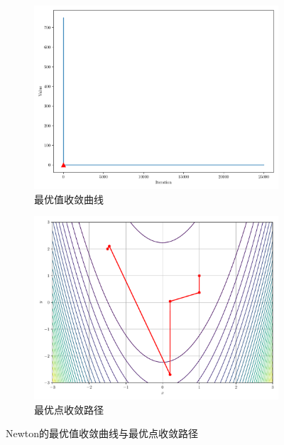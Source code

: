 \begin{figure}[!ht]
    \centering
    \begin{subfigure}{0.4\textwidth}
        \centering
        \includegraphics[width=\textwidth]{figures/Newton_loss.pdf}
        \caption{最优值收敛曲线}
    \end{subfigure}
    \begin{subfigure}{0.4\textwidth}
        \centering
        \includegraphics[width=\textwidth]{figures/Newton_points.pdf}
        \caption{最优点收敛路径}
    \end{subfigure}
    \caption{Newton的最优值收敛曲线与最优点收敛路径}
\end{figure}
